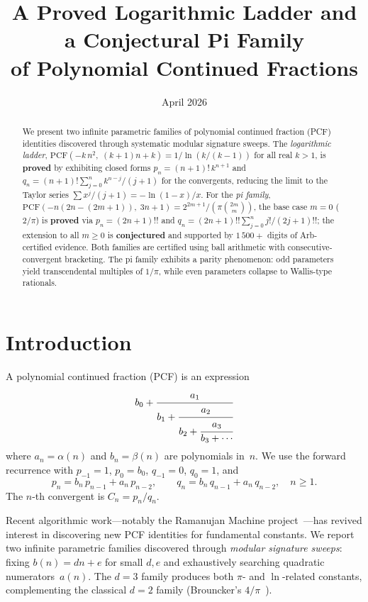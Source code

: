 \documentclass[11pt,a4paper]{article}
\title{A Proved Logarithmic Ladder and a Conjectural Pi Family\\
of Polynomial Continued Fractions}
\author{}
\date{April 2026}
\theoremstyle{plain}
\theoremstyle{remark}
\newcommand{\PCF}{\mathrm{PCF}}
\begin{document}
\maketitle

\begin{abstract}
We present two infinite parametric families of polynomial continued fraction
(PCF) identities discovered through systematic modular signature sweeps.
The \emph{logarithmic ladder},
$\PCF(-k\,n^2,\;(k{+}1)n{+}k) = 1/\ln(k/(k{-}1))$
for all real $k > 1$,
is \textbf{proved} by exhibiting closed forms
$p_n = (n{+}1)!\,k^{n+1}$ and
$q_n = (n{+}1)!\sum_{j=0}^n k^{n-j}/(j{+}1)$
for the convergents, reducing the limit to the Taylor series
$\sum x^j/(j{+}1) = -\ln(1{-}x)/x$.
For the \emph{pi family},
$\PCF(-n(2n{-}(2m{+}1)),\;3n{+}1) = 2^{2m+1}/(\pi\binom{2m}{m})$,
the base case $m=0$ ($2/\pi$) is \textbf{proved} via
$p_n = (2n{+}1)!!$ and
$q_n = (2n{+}1)!!\sum_{j=0}^n j!/(2j{+}1)!!$;
the extension to all $m \ge 0$ is \textbf{conjectured}
and supported by $1\,500{+}$ digits of Arb-certified evidence.
Both families are certified using ball arithmetic with
consecutive-convergent bracketing.
The pi family exhibits a parity phenomenon: odd parameters yield
transcendental multiples of $1/\pi$, while even parameters collapse
to Wallis-type rationals.
\end{abstract}

\section{Introduction}

A polynomial continued fraction (PCF) is an expression
\begin{equation}\label{eq:pcf}
  b_0 + \cfrac{a_1}{b_1 + \cfrac{a_2}{b_2 + \cfrac{a_3}{b_3 + \cdots}}}
\end{equation}
where $a_n = \alpha(n)$ and $b_n = \beta(n)$ are polynomials in~$n$.
We use the forward recurrence with
$p_{-1} = 1$, $p_0 = b_0$, $q_{-1} = 0$, $q_0 = 1$, and
\begin{equation}\label{eq:rec}
  p_n = b_n\,p_{n-1} + a_n\,p_{n-2}, \qquad
  q_n = b_n\,q_{n-1} + a_n\,q_{n-2},
  \quad n \ge 1.
\end{equation}
The $n$-th convergent is $C_n = p_n/q_n$.

Recent algorithmic work---notably the Ramanujan Machine
project~\cite{raayoni2021,elimelech2024}---has revived interest in
discovering new PCF identities for fundamental constants.
We report two infinite parametric families discovered through
\emph{modular signature sweeps}: fixing $b(n) = dn + e$ for small
$d,e$ and exhaustively searching quadratic numerators~$a(n)$.
The $d{=}3$ family produces both $\pi$- and $\ln$-related constants,
complementing the classical $d{=}2$ family
(Brouncker's $4/\pi$~\cite{osler2010}).
\end{document}
